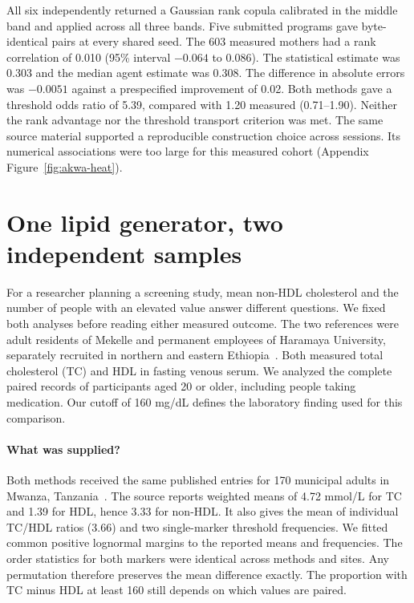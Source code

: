 \documentclass[sigconf,anonymous,review]{acmart}
\begin{document}
All six independently returned a Gaussian rank copula calibrated in the middle band and applied across all three bands. Five submitted programs gave byte-identical pairs at every shared seed. The 603 measured mothers had a rank correlation of 0.010 (95\% interval $-0.064$ to 0.086). The statistical estimate was 0.303 and the median agent estimate was 0.308. The difference in absolute errors was $-0.0051$ against a prespecified improvement of 0.02. Both methods gave a threshold odds ratio of 5.39, compared with 1.20 measured (0.71--1.90). Neither the rank advantage nor the threshold transport criterion was met. The same source material supported a reproducible construction choice across sessions. Its numerical associations were too large for this measured cohort (Appendix Figure~\ref{fig:akwa-heat}).


\section{One lipid generator, two independent samples}
\label{sec:nonhdl}
For a researcher planning a screening study, mean non-HDL cholesterol and the number of people with an elevated value answer different questions. We fixed both analyses before reading either measured outcome. The two references were adult residents of Mekelle and permanent employees of Haramaya University, separately recruited in northern and eastern Ethiopia~\cite{mekelle,haramaya}. Both measured total cholesterol (TC) and HDL in fasting venous serum. We analyzed the complete paired records of participants aged 20 or older, including people taking medication. Our cutoff of 160 mg/dL defines the laboratory finding used for this comparison.

\paragraph{What was supplied?}
Both methods received the same published entries for 170 municipal adults in Mwanza, Tanzania~\cite{kavishe}. The source reports weighted means of 4.72 mmol/L for TC and 1.39 for HDL, hence 3.33 for non-HDL. It also gives the mean of individual TC/HDL ratios (3.66) and two single-marker threshold frequencies. We fitted common positive lognormal margins to the reported means and frequencies. The order statistics for both markers were identical across methods and sites. Any permutation therefore preserves the mean difference exactly. The proportion with TC minus HDL at least 160 still depends on which values are paired.
\end{document}
